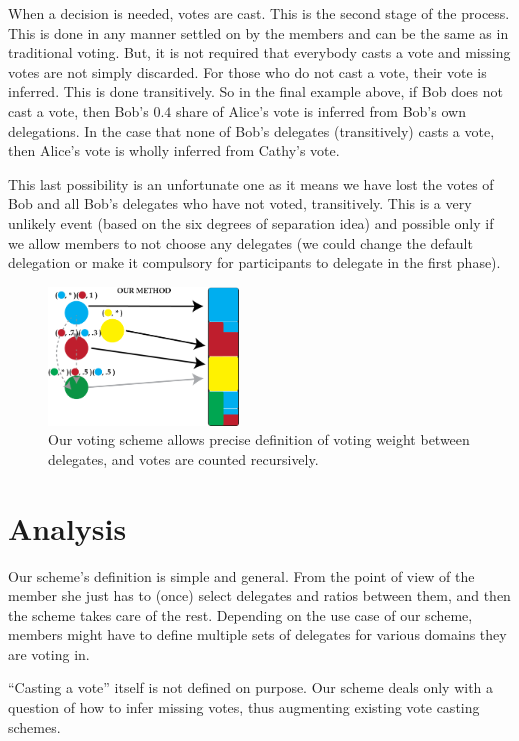 \documentclass[a4paper]{acm_proc_article-sp}
\begin{document}
When a decision is needed, votes are cast. This is the second stage of the process. This is done in any manner settled on by the members and can be the same as in traditional voting. But, it is not required that everybody casts a vote and missing votes are not
simply discarded. For those who do not cast a vote, their vote is inferred. This is done transitively. So in the final example
above, if Bob does not cast a vote, then Bob's $0.4$ share of Alice's vote is inferred from Bob's own delegations. In the
case that none of Bob's delegates (transitively) casts a vote, then Alice's vote is wholly inferred from Cathy's vote.

This last possibility is an unfortunate one as it means we have lost the votes of Bob and all Bob's delegates who have not
voted, transitively. This is a very unlikely event (based on the six degrees of separation idea) and possible only if we allow
members to not choose any delegates (we could change the default delegation or make it compulsory for participants to delegate in the first phase).

\begin{figure}
\centering
\includegraphics[width=0.45\textwidth]{figures/us3.png}
\caption{Our voting scheme allows precise definition of voting weight between delegates, and votes are counted recursively.}
\end{figure}

\section{Analysis}

Our scheme's definition is simple and general. From the point of view of the member she just has to (once) select delegates and ratios
between them, and then the scheme takes care of the rest. Depending on the use case of our scheme, members might have to define
multiple sets of delegates for various domains they are voting in.

``Casting a vote'' itself is not defined on purpose.  Our scheme deals only with a question of how to infer missing votes, thus augmenting
existing vote casting schemes.
\end{document}
